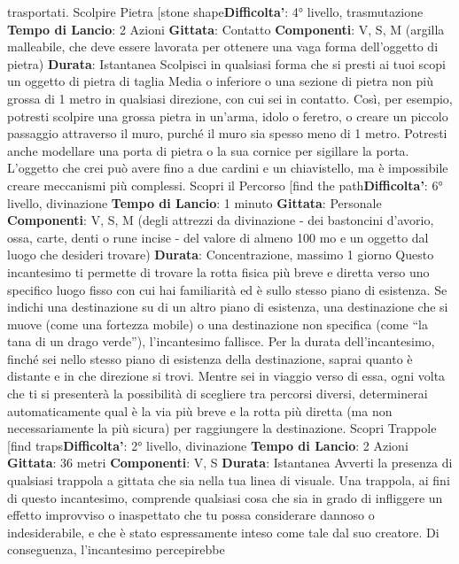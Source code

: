 \begin{multicols}{2}
trasportati.
Scolpire Pietra
[stone shape\textbf{Difficolta'}:
4° livello, trasmutazione
\textbf{Tempo di Lancio}: 2 Azioni
\textbf{Gittata}: Contatto
\textbf{Componenti}: V, S, M (argilla malleabile, che deve
essere lavorata per ottenere una vaga forma
dell’oggetto di pietra)
\textbf{Durata}: Istantanea
Scolpisci in qualsiasi forma che si presti ai tuoi scopi un
oggetto di pietra di taglia Media o inferiore o una
sezione di pietra non più grossa di 1 metro in qualsiasi
direzione, con cui sei in contatto.
Così, per esempio, potresti scolpire una grossa pietra in
un’arma, idolo o feretro, o creare un piccolo passaggio
attraverso il muro, purché il muro sia spesso meno di
1 metro. Potresti anche modellare una porta di pietra o
la sua cornice per sigillare la porta. L’oggetto che crei
può avere fino a due cardini e un chiavistello, ma è
impossibile creare meccanismi più complessi.
Scopri il Percorso
[find the path\textbf{Difficolta'}:
6° livello, divinazione
\textbf{Tempo di Lancio}: 1 minuto
\textbf{Gittata}: Personale
\textbf{Componenti}: V, S, M (degli attrezzi da divinazione -
dei bastoncini d’avorio, ossa, carte, denti o rune incise -
del valore di almeno 100 mo e un oggetto dal luogo che
desideri trovare)
\textbf{Durata}: Concentrazione, massimo 1 giorno
Questo incantesimo ti permette di trovare la rotta fisica
più breve e diretta verso uno specifico luogo fisso con
cui hai familiarità ed è sullo stesso piano di esistenza.
Se indichi una destinazione su di un altro piano di
esistenza, una destinazione che si muove (come una 
fortezza mobile) o una destinazione non specifica
(come “la tana di un drago verde”), l’incantesimo
fallisce.
Per la durata dell’incantesimo, finché sei nello stesso
piano di esistenza della destinazione, saprai quanto è
distante e in che direzione si trovi. Mentre sei in viaggio
verso di essa, ogni volta che ti si presenterà la
possibilità di scegliere tra percorsi diversi, determinerai
automaticamente qual è la via più breve e la rotta più
diretta (ma non necessariamente la più sicura) per
raggiungere la destinazione.
Scopri Trappole
[find traps\textbf{Difficolta'}:
2° livello, divinazione
\textbf{Tempo di Lancio}: 2 Azioni
\textbf{Gittata}: 36 metri
\textbf{Componenti}: V, S
\textbf{Durata}: Istantanea
Avverti la presenza di qualsiasi trappola a gittata che
sia nella tua linea di visuale. Una trappola, ai fini di
questo incantesimo, comprende qualsiasi cosa che sia
in grado di infliggere un effetto improvviso o inaspettato
che tu possa considerare dannoso o indesiderabile, e
che è stato espressamente inteso come tale dal suo
creatore. Di conseguenza, l’incantesimo percepirebbe

\end{multicols}
